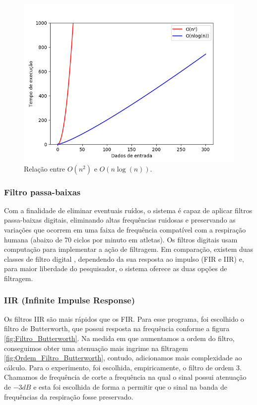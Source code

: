 \begin{figure}[h!]
	\begin{center}
		\includegraphics[width=0.7\linewidth]{images/Complexidade_algoritmo.png}
		\caption{Relação entre \boldmath $O(n^2)$ e $O(n \log (n)) $.   \unboldmath}
		\label{fig:grafico_complexidade}
	\end{center}
\end{figure}

\subsubsection{Filtro passa-baixas}

Com a finalidade de eliminar eventuais ruídos, o sistema é capaz de aplicar filtros passa-baixas digitais, eliminando altas frequências ruidosas e preservando as variações que ocorrem em uma faixa de frequência compatível com a respiração humana (abaixo de 70 ciclos por minuto em atletas). Os filtros digitais usam computação para implementar a ação de filtragem. Em comparação, existem duas classes de filtro digital \cite{haykin2001}, dependendo da sua resposta ao impulso (FIR e IIR) e, para maior liberdade do pesquisador, o sistema oferece as duas opções de filtragem.

\subsubsection{IIR (Infinite Impulse Response)}

Os filtros IIR são mais rápidos que os FIR. Para esse programa, foi escolhido o filtro de Butterworth, que possui resposta na frequência conforme a figura \ref{fig:Filtro_Butterworth}. Na medida em que aumentamos a ordem do filtro, conseguimos obter uma atenuação mais ingrime na filtragem \ref{fig:Ordem_Filtro_Butterworth}, contudo, adicionamos mais complexidade ao cálculo. Para o experimento, foi escolhida, empiricamente, o filtro de ordem 3. Chamamos de frequência de corte a frequência na qual o sinal possui atenuação de $-3 dB$ e esta foi escolhida de forma a permitir que o sinal na banda de frequências da respiração fosse preservado.

